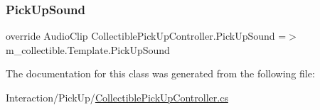 \subsubsection{\texorpdfstring{Pick\+Up\+Sound}{PickUpSound}}
{\footnotesize\ttfamily override Audio\+Clip Collectible\+Pick\+Up\+Controller.\+Pick\+Up\+Sound =$>$ m\+\_\+collectible.\+Template.\+Pick\+Up\+Sound}



The documentation for this class was generated from the following file\+:\begin{DoxyCompactItemize}
\item 
Interaction/\+Pick\+Up/\mbox{\hyperlink{_collectible_pick_up_controller_8cs}{Collectible\+Pick\+Up\+Controller.\+cs}}\end{DoxyCompactItemize}
